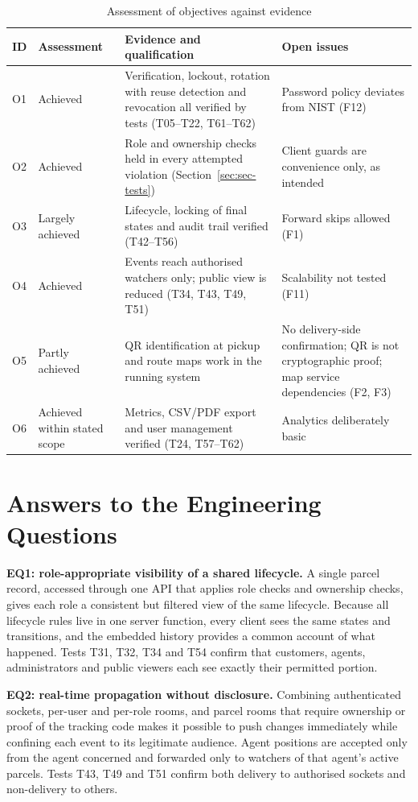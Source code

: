 \begin{table}[htbp]
\centering
\caption{Assessment of objectives against evidence}
\label{tab:obj-achieved}
\small
\begin{tabularx}{\textwidth}{@{}p{0.6cm}P{2.3cm}LP{2.6cm}@{}}
\toprule
\textbf{ID} & \textbf{Assessment} & \textbf{Evidence and qualification} & \textbf{Open issues} \\
\midrule
O1 & Achieved & Verification, lockout, rotation with reuse detection and revocation all verified by tests (T05--T22, T61--T62) & Password policy deviates from NIST (F12) \\
O2 & Achieved & Role and ownership checks held in every attempted violation (Section~\ref{sec:sec-tests}) & Client guards are convenience only, as intended \\
O3 & Largely achieved & Lifecycle, locking of final states and audit trail verified (T42--T56) & Forward skips allowed (F1) \\
O4 & Achieved & Events reach authorised watchers only; public view is reduced (T34, T43, T49, T51) & Scalability not tested (F11) \\
O5 & Partly achieved & QR identification at pickup and route maps work in the running system & No delivery-side confirmation; QR is not cryptographic proof; map service dependencies (F2, F3) \\
O6 & Achieved within stated scope & Metrics, CSV/PDF export and user management verified (T24, T57--T62) & Analytics deliberately basic \\
\bottomrule
\end{tabularx}
\end{table}

\section{Answers to the Engineering Questions}

\textbf{EQ1: role-appropriate visibility of a shared lifecycle.} A single parcel record, accessed through one API that applies role checks and ownership checks, gives each role a consistent but filtered view of the same lifecycle. Because all lifecycle rules live in one server function, every client sees the same states and transitions, and the embedded history provides a common account of what happened. Tests T31, T32, T34 and T54 confirm that customers, agents, administrators and public viewers each see exactly their permitted portion.

\textbf{EQ2: real-time propagation without disclosure.} Combining authenticated sockets, per-user and per-role rooms, and parcel rooms that require ownership or proof of the tracking code makes it possible to push changes immediately while confining each event to its legitimate audience. Agent positions are accepted only from the agent concerned and forwarded only to watchers of that agent's active parcels. Tests T43, T49 and T51 confirm both delivery to authorised sockets and non-delivery to others.

